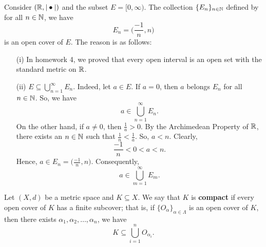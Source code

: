 \documentclass[a4paper]{report}
\begin{document}
\begin{eg}
    Consider \( (\mathbb{R} , | \bullet | ) \) and the subset \( E = [0,\infty ) \). The collection \( \{ {E}_{n} \}_{n \in \mathbb{N} } \) defined by for all \( n \in \mathbb{N}  \), we have 
    \[  {E}_{n} = \Big(  \frac{ -1 }{ n } , n  \Big) \]
    is an open cover of \( E  \). The reason is as follows:
    \begin{enumerate}
        \item[(i)] In homework 4, we proved that every open interval is an open set with the standard metric on \( \mathbb{R}  \).
        \item[(ii)] \( E \subseteq \bigcup_{ n=1  }^{ \infty  }  {E}_{n} \). Indeed, let \( a \in E  \). If \( a = 0  \), then \( a  \) belongs \( {E}_{n} \) for all \( n \in \mathbb{N} \). So, we have 
            \[  a \in \bigcup_{ n=1  }^{ \infty  } {E}_{n}. \]
            On the other hand, if \( a \neq 0  \), then \( \frac{ 1 }{ a }  > 0 \). By the Archimedean Property of \( \mathbb{R}  \), there exists an \( n \in \mathbb{N}  \) such that \( \frac{ 1 }{ n }  < \frac{ 1 }{ a }  \). So, \( a < n  \). Clearly, 
            \[  \frac{ -1 }{ n }  < 0 < a <  n. \]
            Hence, \( a \in {E}_{n} = \Big(  \frac{ -1 }{ n } , n  \Big) \). Consequently, 
            \[  a \in \bigcup_{ m=1  }^{ \infty   } {E}_{m}. \]

    \end{enumerate}
\end{eg}

\begin{definition}[Compactness]
    Let \( (X,d) \) be a metric space and \( K \subseteq X  \). We say that \(  K \) is \textbf{compact} if every open cover of \(  K  \) has a finite subcover; that is, if \( \{ {O}_{\alpha} \}_{\alpha \in \Lambda}  \) is an open cover of \( K  \), then there exists \( {\alpha}_{1}, {\alpha}_{2}, \dots, {\alpha}_{n} \), we have
    \[  K \subseteq \bigcup_{ i = 1  }^{ n }  {O}_{{\alpha}_{i}}. \]
\end{definition}
\end{document}
